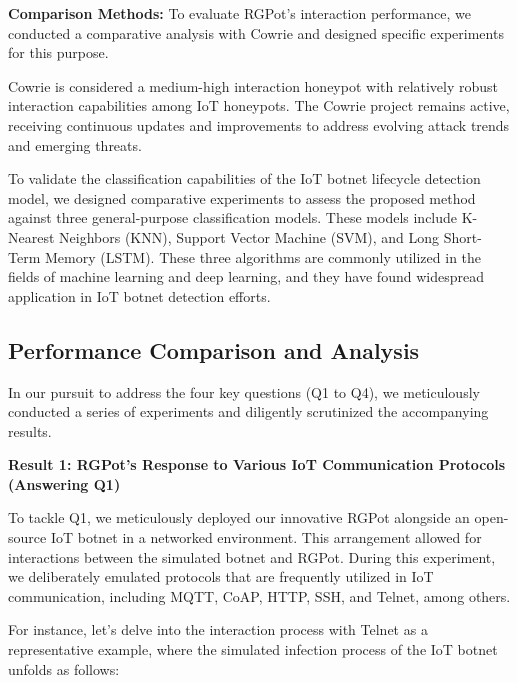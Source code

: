 \documentclass[journal]{IEEEtai}
\begin{document}
\textbf{Comparison Methods:}
To evaluate RGPot's interaction performance, we conducted a comparative analysis with Cowrie\cite{9633881} and designed specific experiments for this purpose.

Cowrie is considered a medium-high interaction honeypot with relatively robust interaction capabilities among IoT honeypots. 
The Cowrie project remains active, receiving continuous updates and improvements to address evolving attack trends and emerging threats.

To validate the classification capabilities of the IoT botnet lifecycle detection model, we designed comparative experiments to assess the proposed method against three general-purpose classification models. 
These models include K-Nearest Neighbors (KNN)\cite{knn}, Support Vector Machine (SVM)\cite{PONMALAR2022108295}, and Long Short-Term Memory (LSTM)\cite{LINDEMANN2021103498}. 
These three algorithms are commonly utilized in the fields of machine learning and deep learning, and they have found widespread application in IoT botnet detection efforts.





\subsection{Performance Comparison and Analysis}
\label{Performance Comparison and Analysis}


In our pursuit to address the four key questions (Q1 to Q4), we meticulously conducted a series of experiments and diligently scrutinized the accompanying results.

\textbf{Result 1: RGPot's Response to Various IoT Communication Protocols (Answering Q1)}

To tackle Q1, we meticulously deployed our innovative RGPot alongside an open-source IoT botnet in a networked environment. This arrangement allowed for interactions between the simulated botnet and RGPot. 
During this experiment, we deliberately emulated protocols that are frequently utilized in IoT communication, including MQTT, CoAP, HTTP, SSH, and Telnet, among others.

For instance, let's delve into the interaction process with Telnet as a representative example, where the simulated infection process of the IoT botnet unfolds as follows:
\end{document}
